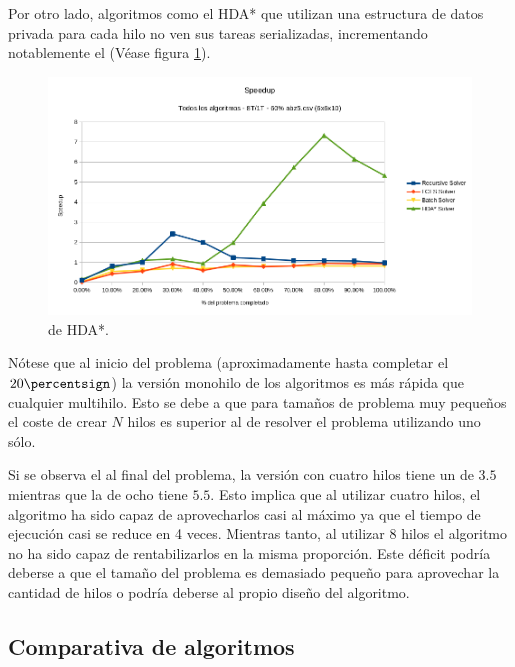 Por otro lado, algoritmos como el HDA*
que utilizan una estructura de datos privada para cada hilo
no ven sus tareas serializadas,
incrementando notablemente el 
(Véase figura \ref{fig:ParalelismoHDA}).

\begin{figure}[h]
    \begin{center}
        \includegraphics[width=\textwidth]{Media/Ch2/Speedup_One_Problem.png}
    \end{center}
    \caption{ de HDA*.}
    \label{fig:ParalelismoHDA}
\end{figure}

Nótese que al inicio del problema (aproximadamente hasta completar el $20\percentsign$)
la versión monohilo de los algoritmos es más rápida que cualquier multihilo.
Esto se debe a que para tamaños de problema muy pequeños
el coste de crear $N$ hilos es superior al de resolver el problema
utilizando uno sólo.

Si se observa el  al final del problema,
la versión con cuatro hilos tiene un 
de $3.5$ mientras que la de ocho tiene $5.5$.
Esto implica que al utilizar cuatro hilos,
el algoritmo ha sido capaz de aprovecharlos casi al máximo
ya que el tiempo de ejecución casi se reduce en 4
veces.
Mientras tanto, al utilizar 8 hilos el algoritmo
no ha sido capaz de rentabilizarlos en la misma proporción.
Este déficit podría deberse a que el tamaño del problema
es demasiado pequeño para aprovechar la cantidad de hilos
o podría deberse al propio diseño del algoritmo.

\subsection{Comparativa de algoritmos}

